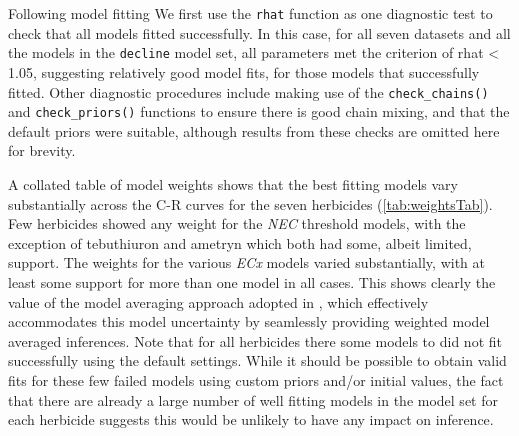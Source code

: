 \documentclass[
  shortnames]{jss}
\begin{document}
Following model fitting We first use the \texttt{rhat} function as one diagnostic test to check that all models fitted successfully. In this case, for all seven datasets and all the models in the \texttt{decline} model set, all parameters met the criterion of rhat \textless{} 1.05, suggesting relatively good model fits, for those models that successfully fitted. Other diagnostic procedures include making use of the \texttt{check\_chains()} and \texttt{check\_priors()} functions to ensure there is good chain mixing, and that the default priors were suitable, although results from these checks are omitted here for brevity.

\begin{CodeChunk}
\end{CodeChunk}

A collated table of model weights shows that the best fitting models vary substantially across the C-R curves for the seven herbicides (\autoref{tab:weightsTab}). Few herbicides showed any weight for the \emph{NEC} threshold models, with the exception of tebuthiuron and ametryn which both had some, albeit limited, support. The weights for the various \emph{ECx} models varied substantially, with at least some support for more than one model in all cases. This shows clearly the value of the model averaging approach adopted in , which effectively accommodates this model uncertainty by seamlessly providing weighted model averaged inferences. Note that for all herbicides there some models to did not fit successfully using the default  settings. While it should be possible to obtain valid fits for these few failed models using custom priors and/or initial values, the fact that there are already a large number of well fitting models in the model set for each herbicide suggests this would be unlikely to have any impact on inference.
\end{document}
